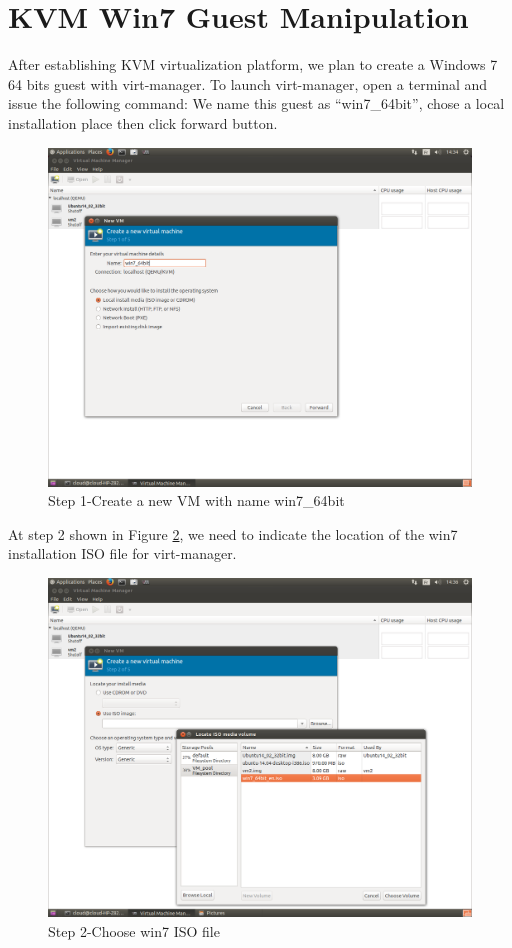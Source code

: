 \section{KVM Win7 Guest Manipulation} 
After establishing KVM virtualization platform, we plan to create a Windows 7 64 bits guest with virt-manager. 
To launch virt-manager, open a terminal and issue the following command: 
We name this guest as ``win7\_64bit'', chose a local installation place then click forward button.
\begin{figure}[htbp]
	\centering
		\includegraphics[scale=0.4]{Figures/Figure12.png}
	\caption[Step 1-Create a new VM with name win7\_64bit]{Step 1-Create a new VM with name win7\_64bit}
	\label{fig:Step 1-Create a new VM with name win7-64bit}
\end{figure}

At step 2 shown in Figure \ref{fig:Choose win7 ISO file}, we need to indicate the location of the win7 installation ISO file for virt-manager.
\begin{figure}[htbp]
	\centering
		\includegraphics[scale=0.4]{Figures/Figure13.png}
	\caption[Step 2-Choose win7 ISO file]{Step 2-Choose win7 ISO file}
	\label{fig:Choose win7 ISO file}
\end{figure}

